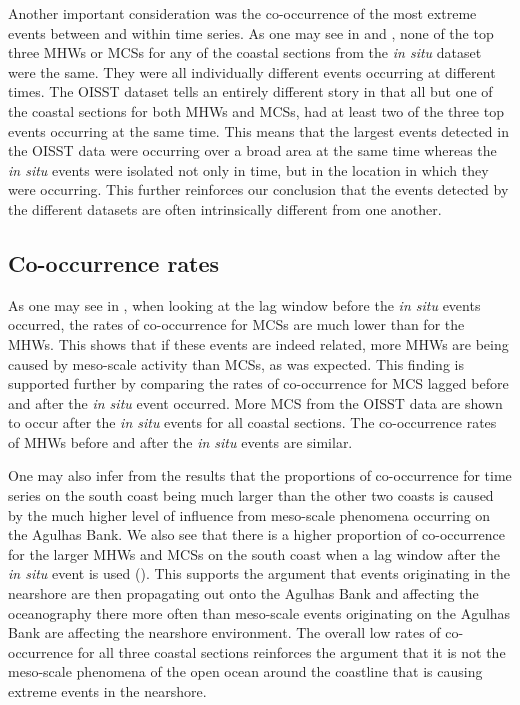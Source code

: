 \documentclass[a4paper,10pt,review]{elsarticle}
\begin{document}
Another important consideration was the co-occurrence of the most extreme events between and within time series. As one may see in  and , none of the top three MHWs or MCSs for any of the coastal sections from the \emph{in situ} dataset were the same. They were all individually different events occurring at different times. The OISST dataset tells an entirely different story in that all but one of the coastal sections for both MHWs and MCSs, had at least two of the three top events occurring at the same time. This means that the largest events detected in the OISST data were occurring over a broad area at the same time whereas the \emph{in situ} events were isolated not only in time, but in the location in which they were occurring. This further reinforces our conclusion that the events detected by the different datasets are often intrinsically different from one another.

\subsection{Co-occurrence rates}
As one may see in , when looking at the lag window before the \emph{in situ} events occurred, the rates of co-occurrence for MCSs are much lower than for the MHWs. This shows that if these events are indeed related, more MHWs are being caused by meso-scale activity than MCSs, as was expected. This finding is supported further by comparing the rates of co-occurrence for MCS lagged before and after the \emph{in situ} event occurred. More MCS from the OISST data are shown to occur after the \emph{in situ} events for all coastal sections. The co-occurrence rates of MHWs before and after the \emph{in situ} events are similar.

One may also infer from the results that the proportions of co-occurrence for time series on the south coast being much larger than the other two coasts is caused by the much higher level of influence from meso-scale phenomena occurring on the Agulhas Bank. We also see that there is a higher proportion of co-occurrence for the larger MHWs and MCSs on the south coast when a lag window after the \emph{in situ} event is used (). This supports the argument that events originating in the nearshore are then propagating out onto the Agulhas Bank and affecting the oceanography there more often than meso-scale events originating on the Agulhas Bank are affecting the nearshore environment. The overall low rates of co-occurrence for all three coastal sections reinforces the argument that it is not the meso-scale phenomena of the open ocean around the coastline that is causing extreme events in the nearshore.
\end{document}
